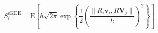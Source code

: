 \begin{equation}
    \label{eq:ad_kde_e}
    S_i^{\text{eKDE}} = \text{E}\left[h\sqrt{2\pi}\exp\left\lbrace\frac{1}{2}\left(\frac{\lVert R_i\bm{v}_i,R\bm{V}_j\rVert}{h}\right)^2\right\rbrace\right]
\end{equation}
